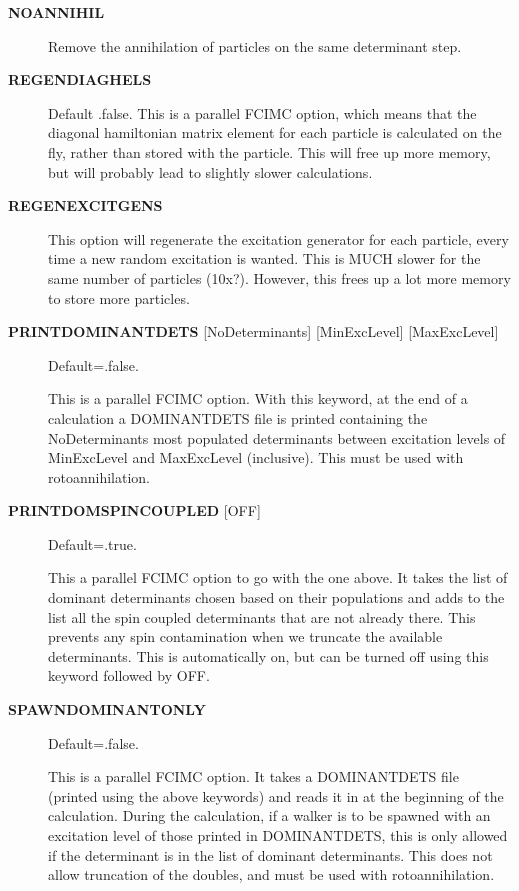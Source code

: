\documentclass[openany,a4paper,10pt,english]{manual}
\begin{document}
\begin{description}
\item[\textbf{NOANNIHIL}] \leavevmode
Remove the annihilation of particles on the same
determinant step.

\item[\textbf{REGENDIAGHELS}] \leavevmode
Default .false.
This is a parallel FCIMC option, which means that the diagonal hamiltonian matrix
element for each particle is calculated on the fly, rather than stored with the
particle. This will free up more memory, but will probably lead to slightly slower
calculations.

\item[\textbf{REGENEXCITGENS}] \leavevmode
This option will regenerate the excitation generator for each particle, every time a
new random excitation is wanted. This is MUCH slower for the same number of particles
(10x?). However, this frees up a lot more memory to store more particles.

\item[\textbf{PRINTDOMINANTDETS} {[}NoDeterminants{]} {[}MinExcLevel{]} {[}MaxExcLevel{]}] \leavevmode
Default=.false.

This is a parallel FCIMC option.  With this keyword, at the end of a calculation a DOMINANTDETS file
is printed containing the NoDeterminants most populated determinants between excitation
levels of MinExcLevel and MaxExcLevel (inclusive).  This must be used with rotoannihilation.

\item[\textbf{PRINTDOMSPINCOUPLED} {[}OFF{]}] \leavevmode
Default=.true.

This a parallel FCIMC option to go with the one above.  It takes the list of dominant determinants
chosen based on their populations and adds to the list all the spin coupled determinants that
are not already there.  This prevents any spin contamination when we truncate the available
determinants.  This is automatically on, but can be turned off using this keyword followed by OFF.

\item[\textbf{SPAWNDOMINANTONLY}] \leavevmode
Default=.false.

This is a parallel FCIMC option.  It takes a DOMINANTDETS file (printed using the above keywords)
and reads it in at the beginning of the calculation.  During the calculation, if a walker is
to be spawned with an excitation level of those printed in DOMINANTDETS, this is only allowed if
the determinant is in the list of dominant determinants.  This does not allow truncation of
the doubles, and must be used with rotoannihilation.


\end{description}
\end{document}
